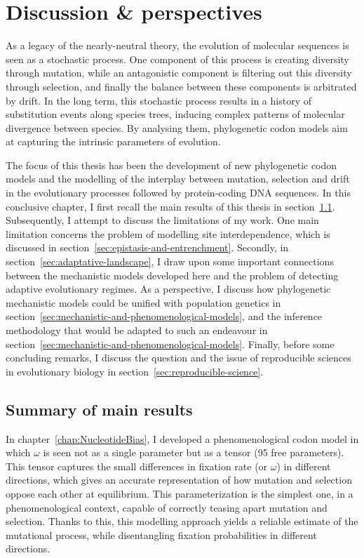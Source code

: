\chapter{Discussion \& perspectives}
\label{ch:discussion-perspectives}
{\hypersetup{linkcolor=GREYDARK}\minitoc}

As a legacy of the \gls{nearly-neutral} theory, the evolution of molecular sequences is seen as a stochastic process.
One component of this process is creating diversity through mutation, while an antagonistic component is filtering out this diversity through selection, and finally the balance between these components is arbitrated by drift.
In the long term, this stochastic process results in a history of \gls{substitution} events along species trees, inducing complex patterns of molecular divergence between species.
By analysing them, phylogenetic \gls{codon} models aim at capturing the intrinsic parameters of evolution.

The focus of this thesis has been the development of new phylogenetic \gls{codon} models and the modelling of the interplay between mutation, selection and drift in the evolutionary processes followed by protein-coding \acrshort{DNA} sequences.
In this conclusive chapter, I first recall the main results of this thesis in section~\ref{sec:summary-of-main-results}.
Subsequently, I attempt to discuss the limitations of my work.
One main limitation concerns the problem of modelling site interdependence, which is discussed in section~\ref{sec:epistasis-and-entrenchment}.
Secondly, in section~\ref{sec:adaptative-landscape}, I draw upon some important connections between the mechanistic models developed here and the problem of detecting adaptive evolutionary regimes.
As a perspective, I discuss how phylogenetic mechanistic models could be unified with population genetics in section~\ref{sec:mechanistic-and-phenomenological-models}, and the inference methodology that would be adapted to such an endeavour in section~\ref{sec:mechanistic-and-phenomenological-models}.
Finally, before some concluding remarks, I discuss the question and the issue of reproducible sciences in evolutionary biology in section~\ref{sec:reproducible-science}.


\section{Summary of main results}
\label{sec:summary-of-main-results}

In chapter~\ref{chap:NucleotideBias}, I developed a phenomenological \gls{codon} model in which $\omega$ is seen not as a single parameter but as a tensor (95 free parameters).
This tensor captures the small differences in fixation rate (or $\omega$) in different directions, which gives an accurate representation of how mutation and selection oppose each other at equilibrium.
This parameterization is the simplest one, in a phenomenological context, capable of correctly teasing apart mutation and selection.
Thanks to this, this modelling approach yields a reliable estimate of the mutational process, while disentangling fixation probabilities in different directions.


